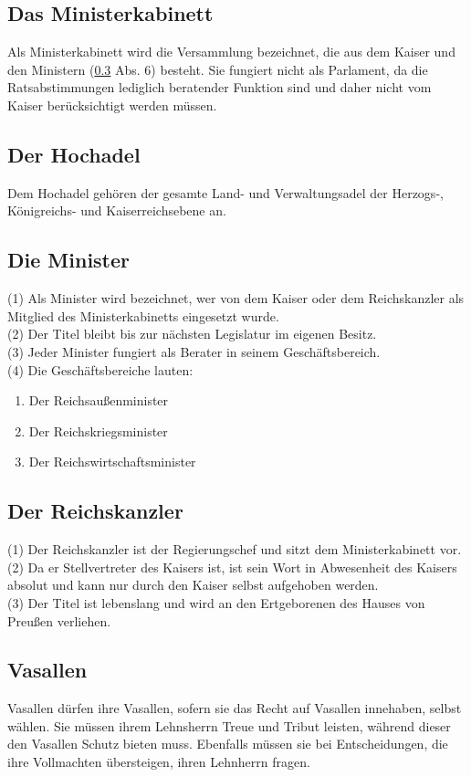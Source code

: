 \documentclass{article}
\begin{document}
\subsection{Das Ministerkabinett}
Als Ministerkabinett wird die Versammlung bezeichnet, die aus dem Kaiser und den Ministern (\ref{koenige} Abs. 6) besteht. Sie fungiert nicht als Parlament, da die Ratsabstimmungen lediglich beratender Funktion sind und daher nicht vom Kaiser berücksichtigt werden müssen.

\subsection{Der Hochadel}
Dem Hochadel gehören der gesamte Land- und Verwaltungsadel der Herzogs-, Königreichs- und Kaiserreichsebene an.

\subsection{Die Minister}\label{koenige} 
(1) Als Minister wird bezeichnet, wer von dem Kaiser oder dem Reichskanzler als Mitglied des Ministerkabinetts eingesetzt wurde.\\
(2) Der Titel bleibt bis zur nächsten Legislatur im eigenen Besitz.\\
(3) Jeder Minister fungiert als Berater in seinem Geschäftsbereich.\\
(4) Die Geschäftsbereiche lauten:
\begin{enumerate}
	\item Der Reichsaußenminister
	\item Der Reichskriegsminister
	\item Der Reichswirtschaftsminister
\end{enumerate}

\subsection{Der Reichskanzler}
(1) Der Reichskanzler ist der Regierungschef und sitzt dem Ministerkabinett vor.\\
(2) Da er Stellvertreter des Kaisers ist, ist sein Wort in Abwesenheit des Kaisers absolut und kann nur durch den Kaiser selbst aufgehoben werden.\\
(3) Der Titel ist lebenslang und wird an den Ertgeborenen des Hauses von Preußen verliehen.

\subsection{Vasallen}
Vasallen dürfen ihre Vasallen, sofern sie das Recht auf Vasallen innehaben, selbst wählen. Sie müssen ihrem Lehnsherrn Treue und Tribut leisten, während dieser den Vasallen Schutz bieten muss. Ebenfalls müssen sie bei Entscheidungen, die ihre Vollmachten übersteigen, ihren Lehnherrn fragen.
\end{document}
